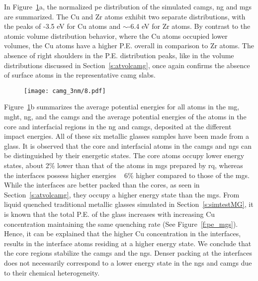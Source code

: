 \begin{changebar}
In Figure~\ref{f:pe_camg}a, the normalized \gls{pe} distribution of the simulated \gls{camg}s, \gls{ng} and \gls{mg}s are summarized. The Cu and Zr atoms exhibit two separate distributions, with the peaks of -3.5 eV for Cu atoms and $\sim$-6.4 eV for Zr atoms. By contrast to the atomic volume distribution behavior, where the Cu atoms occupied lower volumes, the Cu atoms have a higher P.E. overall in comparison to Zr atoms. The absence of right shoulders in the P.E. distribution peaks, like in the volume distributions discussed in Section~\ref{s:atvolcamg}, once again confirms the absence of surface atoms in the representative \gls{camg} slabs. \par

\begin{figure} %
	\centering
	\texttt{[image: camg\_3nm/8.pdf]}
	\label{f:pe_camg}
\end{figure}

Figure~\ref{f:pe_camg}b summarizes the average potential energies for all atoms in the \gls{mg}, \gls{mght}, \gls{ng}, and the \gls{camg}s and the average potential energies of the atoms in the core and interfacial regions in the \gls{ng} and \gls{camg}s, deposited at the different impact energies. All of these six metallic glasses samples have been made from a  \cz glass. It is observed that the core and interfacial atoms in the \gls{camg}s and \gls{ng}s can be distinguished by their energetic states. The core atoms occupy lower energy states, about 2\% lower than that of the atoms in \gls{mg}s prepared by \gls{rq}, whereas the interfaces possess higher energies ~ 6\% higher compared to those of the \gls{mg}s. While the interfaces are better packed than the cores, as seen in Section~\ref{s:atvolcamg}, they occupy a higher energy state than the \gls{mg}s. From liquid quenched traditional metallic glasses simulated in Section~\ref{s:simtestMG}, it is known that the total P.E. of the glass increases with increasing Cu concentration maintaining the same quenching rate (See Figure~\ref{f:pe_mgs}). Hence, it can be explained that the higher Cu concentration in the interfaces, results in the interface atoms residing at a higher energy state. We conclude that the core regions stabilize the \gls{camg}s and the \gls{ng}s. Denser packing at the interfaces does not necessarily correspond to a lower energy state in the \gls{ng}s and \gls{camg}s due to their chemical heterogeneity. \par

\end{changebar}

